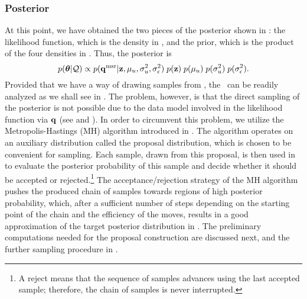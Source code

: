 \subsubsection{Posterior}
At this point, we have obtained the two pieces of the posterior shown in : the likelihood function, which is the density in , and the prior, which is the product of the four densities in . Thus, the posterior is
\begin{equation} \elabel{posterior}
  \f{\vparam | \QData} \propto \f{\vq^\meas | \vz, \mu_\u, \sigma^2_\u, \sigma^2_\noise} \; \f{\vz} \; \f{\mu_\u} \; \f{\sigma^2_\u} \; \f{\sigma^2_\noise}.
\end{equation}
Provided that we have a way of drawing samples from , the \qoi\ can be readily analyzed as we shall see in .
The problem, however, is that the direct sampling of the posterior is not possible due to the data model involved in the likelihood function via $\mathbf{q}$ (see  and ).
In order to circumvent this problem, we utilize the Metropolis-Hastings (MH) algorithm \cite{gelman2004} introduced in .
The algorithm operates on an auxiliary distribution called the proposal distribution, which is chosen to be convenient for sampling.
Each sample, drawn from this proposal, is then used in  to evaluate the posterior probability of this sample and decide whether it should be accepted or rejected.\footnote{A reject means that the sequence of samples advances using the last accepted sample; therefore, the chain of samples is never interrupted.}
The acceptance/rejection strategy of the MH algorithm pushes the produced chain of samples towards regions of high posterior probability, which, after a sufficient number of steps depending on the starting point of the chain and the efficiency of the moves, results in a good approximation of the target posterior distribution in .
The preliminary computations needed for the proposal construction are discussed next, and the further sampling procedure in .

